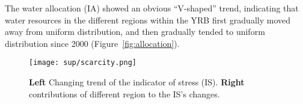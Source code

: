 The water allocation (IA) showed an obvious ``V-shaped'' trend, indicating that water resources in the different regions within the YRB first gradually moved away from uniform distribution, and then gradually tended to uniform distribution since 2000 (Figure~\ref{fig:allocation}).

\begin{figure}[!htb]
    \centering
    \texttt{[image: sup/scarcity.png]}
    \caption{
        \textbf{Left} Changing trend of the indicator of stress (IS).
        \textbf{Right} contributions of different region to the IS's changes.
    }\label{fig:scarcity}
\end{figure}
